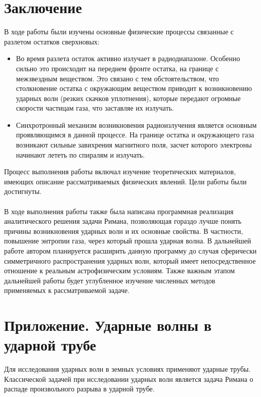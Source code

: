\documentclass[a4paper,12pt]{extarticle}
\begin{document}
\section{Заключение}
В ходе работы были изучены основные физические процессы связанные с разлетом остатков сверхновых: 
\begin{itemize}
    \item Во время разлета остаток активно излучает в радиодиапазоне. 
    Особенно сильно это происходит на переднем фронте остатка, на границе с межзвездным веществом. Это связано с тем обстоятельством, что столкновение остатка с окружающим веществом приводит к возникновению ударных волн (резких скачков уплотнения), которые передают огромные скорости частицам газа, что заставляе их излучать.
    \item Синхротронный механизм возникновения радиоизлучения является основным проявляющимся в данной процессе. На границе остатка и окружающего газа возникают сильные завихрения магнитного поля, засчет которого электроны начинают лететь по спиралям и излучать.
\end{itemize}
Процесс выполнения работы включал изучение теоретических материалов, имеющих описание рассматриваемых физических явлений. Цели работы были достигнуты. 
\\ \\
В ходе выполнения работы также была написана программная реализация аналитического решения задачи Римана, позволяющая гораздо лучше понять причины возникновения ударных волн и их основные свойства. В частности, повышение энтропии газа, через который прошла ударная волна.
В дальнейшей работе автором планируется расширить данную программу до случая сферически симметричного распространения ударных волн, который имеет непосредственное отношение к реальным астрофизическим условиям. Также важным этапом дальнейшей работы будет углубленное изучение численных методов применяемых к рассматриваемой задаче. 

\sloppy
\printbibliography
{}

\appendix
\section{Приложение. Ударные волны в ударной трубе}\label{sec: Shockwave}
Для исследования  ударных волн в земных условиях применяют ударные трубы. Классической задачей при исследовании ударных волн является задача Римана о распаде произвольного разрыва в ударной трубе. 
\end{document}
